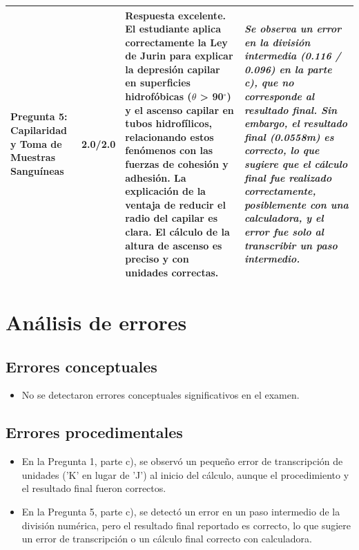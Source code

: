 \documentclass[11pt,a4paper]{article}
\begin{document}
\begin{longtable}{>{\bfseries}p{2.8cm} p{1.6cm} p{7.0cm} p{2.8cm}}
    \textbf{Pregunta 5: Capilaridad y Toma de Muestras Sanguíneas} & 2.0/2.0 & Respuesta excelente. El estudiante aplica correctamente la Ley de Jurin para explicar la depresión capilar en superficies hidrofóbicas ($\theta$ \textgreater{} 90$^{\circ}$) y el ascenso capilar en tubos hidrofílicos, relacionando estos fenómenos con las fuerzas de cohesión y adhesión. La explicación de la ventaja de reducir el radio del capilar es clara. El cálculo de la altura de ascenso es preciso y con unidades correctas. & \textit{Se observa un error en la división intermedia (0.116 / 0.096) en la parte c), que no corresponde al resultado final. Sin embargo, el resultado final (0.0558m) es correcto, lo que sugiere que el cálculo final fue realizado correctamente, posiblemente con una calculadora, y el error fue solo al transcribir un paso intermedio.} \\
    \midrule
\end{longtable}

\section*{Análisis de errores}

\subsection*{Errores conceptuales}
\begin{itemize}[leftmargin=1.5em, itemsep=2pt]
  \item No se detectaron errores conceptuales significativos en el examen.
\end{itemize}

\subsection*{Errores procedimentales}
\begin{itemize}[leftmargin=1.5em, itemsep=2pt]
  \item En la Pregunta 1, parte c), se observó un pequeño error de transcripción de unidades ('K' en lugar de 'J') al inicio del cálculo, aunque el procedimiento y el resultado final fueron correctos.
  \item En la Pregunta 5, parte c), se detectó un error en un paso intermedio de la división numérica, pero el resultado final reportado es correcto, lo que sugiere un error de transcripción o un cálculo final correcto con calculadora.
\end{itemize}
\end{document}

